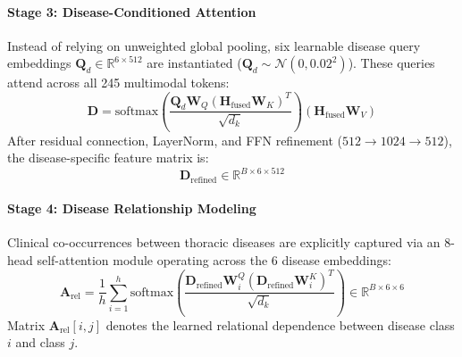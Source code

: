 \documentclass[journal]{IEEEtran}
\begin{document}
\paragraph{Stage 3: Disease-Conditioned Attention}
Instead of relying on unweighted global pooling, six learnable disease query embeddings $\mathbf{Q}_d \in \mathbb{R}^{6 \times 512}$ are instantiated ($\mathbf{Q}_d \sim \mathcal{N}(0, 0.02^2)$). These queries attend across all 245 multimodal tokens:
\begin{equation}
\mathbf{D} = \text{softmax}\left(\frac{\mathbf{Q}_d \mathbf{W}_Q (\mathbf{H}_{\text{fused}}\mathbf{W}_K)^T}{\sqrt{d_k}}\right) (\mathbf{H}_{\text{fused}}\mathbf{W}_V)
\end{equation}
After residual connection, LayerNorm, and FFN refinement ($512 \rightarrow 1024 \rightarrow 512$), the disease-specific feature matrix is:
\begin{equation}
\mathbf{D}_{\text{refined}} \in \mathbb{R}^{B \times 6 \times 512}
\end{equation}

\paragraph{Stage 4: Disease Relationship Modeling}
Clinical co-occurrences between thoracic diseases are explicitly captured via an 8-head self-attention module operating across the 6 disease embeddings:
\begin{equation}
\mathbf{A}_{\text{rel}} = \frac{1}{h}\sum_{i=1}^h \text{softmax}\left(\frac{\mathbf{D}_{\text{refined}}\mathbf{W}_i^Q (\mathbf{D}_{\text{refined}}\mathbf{W}_i^K)^T}{\sqrt{d_k}}\right) \in \mathbb{R}^{B \times 6 \times 6}
\label{eq:disease_rel_matrix}
\end{equation}
Matrix $\mathbf{A}_{\text{rel}}[i, j]$ denotes the learned relational dependence between disease class $i$ and class $j$.
\end{document}
